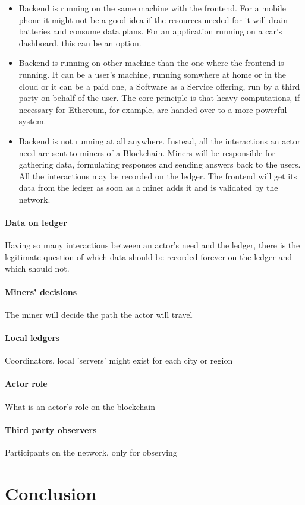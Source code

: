 \documentclass[a4paper,12pt,twoside]{book}
\begin{document}
    \begin{itemize}
        \item Backend is running on the same machine with the frontend. For a mobile phone it might not be a good idea if the resources needed for it will drain batteries and consume data plans. For an application running on a car's dashboard, this can be an option.
        \item Backend is running on other machine than the one where the frontend is running. It can be a user's machine, running somwhere at home or in the cloud or it can be a paid one, a Software as a Service offering, run by a third party on behalf of the user. The core principle is that heavy computations, if necessary for Ethereum, for example, are handed over to a more powerful system.
        \item Backend is not running at all anywhere. Instead, all the interactions an actor need are sent to miners of a Blockchain. Miners will be responsible for gathering data, formulating responses and sending answers back to the users. All the interactions may be recorded on the ledger. The frontend will get its data from the ledger as soon as a miner adds it and is validated by the network.
    \end{itemize}

    \paragraph{Data on ledger} Having so many interactions between an actor's need and the ledger, there is the legitimate question of which data should be recorded forever on the ledger and which should not.

    \paragraph{Miners' decisions} The miner will decide the path the actor will travel

    \paragraph{Local ledgers} Coordinators, local 'servers' might exist for each city or region

    \paragraph{Actor role} What is an actor's role on the blockchain

    \paragraph{Third party observers} Participants on the network, only for observing

\section{Conclusion}
\label{sec:Conclusion}


\end{document}
